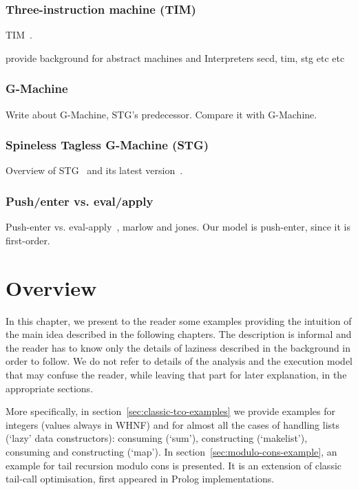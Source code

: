 \documentclass[diploma]{softlab-thesis}
\begin{document}
\subsection{Three-instruction machine (TIM)}
\label{sec:tim}

TIM~\cite{Argo89}.

provide background for abstract machines and Interpreters
secd, tim, stg etc etc

\subsection{G-Machine}
\label{sec:g-machine}
Write about G-Machine, STG's predecessor. Compare it with G-Machine.

\subsection{Spineless Tagless G-Machine (STG)}
\label{sec:stg}
Overview of STG~\cite{Jo92} and its latest version~\cite{Ma06}.

\subsection{Push/enter vs. eval/apply}
\label{sec:push-enter}
Push-enter vs. eval-apply~\cite{Ma06}, marlow and jones. Our model is push-enter, since it is first-order.






\chapter {Overview}
\label{ch:overview}

In this chapter, we present to the reader some examples providing the intuition of the main idea described 
in the following chapters. The description is informal and the reader has to know only the details of laziness 
described in the background in order to follow. We do not refer to details of the analysis and the execution model 
that may confuse the reader, while leaving that part for later explanation, in the appropriate sections.

More specifically, in section~\ref{sec:classic-tco-examples} we provide examples for integers (values always in WHNF) and 
for almost all the cases of handling lists (`lazy' data constructors): 
consuming (`sum'), constructing (`makelist'), consuming and constructing (`map'). 
In section~\ref{sec:modulo-cons-example}, an example for tail recursion modulo cons is presented. It is an extension of classic 
tail-call optimisation, first appeared in Prolog implementations.
\end{document}
